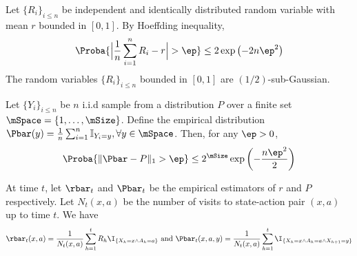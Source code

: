         \begin{thm}
        \label{thm:hoeffding}
            Let $\{R_i\}_{i\le n}$ be independent and identically distributed random variable with mean $r$ bounded in $[0,1]$.
            By Hoeffding inequality,
            \begin{align*}
                \Proba{\Big\vert\frac{1}{n}\sum_{i=1}^nR_i-r\Big\vert>\ep}\le2\exp\left(-2n\ep^2\right)
            \end{align*}
            The random variables $\{R_i\}_{i\le n}$ bounded in $[0,1]$ are $(1/2)$-sub-Gaussian.
        \end{thm}
        \begin{thm}
        \label{thm:weissman}
            Let $\{Y_i\}_{i\le n}$ be $n$ i.i.d sample from a distribution $P$ over a finite set $\mSpace=\{1,\dots,\mSize\}$. Define the empirical distribution $\Pbar(y)=\frac{1}{n}\sum_{i=1}^{n}\mathbb{I}_{Y_i=y}, \forall y\in\mSpace$. Then, for any $\ep>0$,
            \begin{align*}
                \Proba{\Vert\Pbar-P\Vert_1> \ep} \le 2^\mSize\exp\left(-\frac{n\ep^2}{2}\right)
            \end{align*}
        \end{thm}
        
        At time $t$, let $\rbar_t$ and $\Pbar_t$ be the empirical estimators of $r$ and $P$ respectively.
        Let $N_t(x,a)$ be the number of visits to state-action pair $(x,a)$ up to time $t$.
        We have
        \begin{align*}
            \rbar_t(x,a) =\frac1{N_t(x,a)}\sum_{h=1}^{t}R_h\I_{\{X_h=x\wedge A_h=a\}} \text{ and } \Pbar_t(x,a,y) =\frac1{N_t(x,a)}\sum_{h=1}^{t}\I_{\{X_h=x\wedge A_h=a\wedge X_{h+1}=y\}}
        \end{align*}

